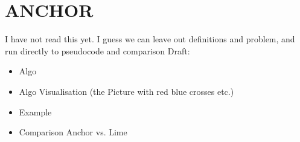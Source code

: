 \section{ANCHOR}
\begin{frame}
	I have not read this yet. I guess we can leave out definitions and problem, and run directly to pseudocode and comparison
	Draft:
	\begin{itemize}
		\item Algo
		\item Algo Visualisation (the Picture with red blue crosses etc.)
		\item Example
		\item Comparison Anchor vs. Lime
	\end{itemize}
\end{frame}